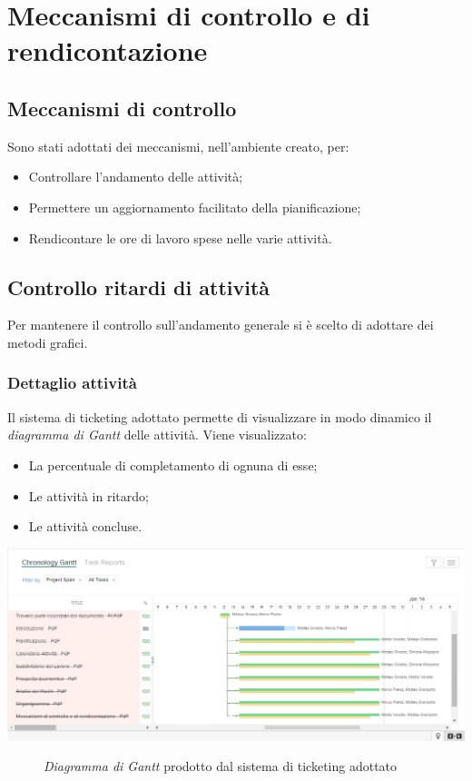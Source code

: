 \newpage
\section{Meccanismi di controllo e di rendicontazione}
	\subsection{Meccanismi di controllo} Sono stati adottati dei meccanismi, nell'ambiente creato, per:
	\begin{itemize}
		\item Controllare l'andamento delle attività;
		\item Permettere un aggiornamento facilitato della pianificazione;
		\item Rendicontare le ore di lavoro spese nelle varie attività.
	\end{itemize}
	\subsection{Controllo ritardi di attività}  Per mantenere il controllo sull'andamento generale si è scelto di adottare dei metodi grafici.
		\subsubsection{Dettaglio attività} Il sistema di ticketing adottato permette di visualizzare in modo dinamico il \textit{diagramma di  Gantt} delle attività. Viene visualizzato:
		\begin{itemize}
			\item La percentuale di completamento di ognuna di esse;
			\item Le attività in ritardo;
			\item Le attività concluse.
		\end{itemize}
		\begin{center}
			\includegraphics[keepaspectratio = true, width=16cm]{immagini/PdP_ZohoGantt.png}
		\end{center}
		\begin{figure}[h]
			\caption{\textit{Diagramma di Gantt} prodotto dal sistema di ticketing adottato}\label{etichetta}
		\end{figure}

